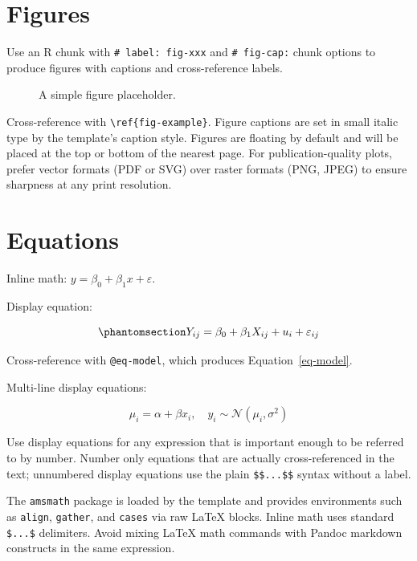 \documentclass[
    a4paper,
    man,
    floatsintext
]{glossaPX2}
\begin{document}
\section{Figures}\label{figures}

Use an R chunk with \texttt{\#\textbar{}\ label:\ fig-xxx} and
\texttt{\#\textbar{}\ fig-cap:} chunk options to produce figures with
captions and cross-reference labels.

\begin{figure}[ht]
  \centering
  \fbox{\rule{0pt}{3cm}\rule{0.8\linewidth}{0pt}}
  \caption{A simple figure placeholder.}
  \label{fig-example}
\end{figure}

Cross-reference with \texttt{\textbackslash{}ref\{fig-example\}}. Figure
captions are set in small italic type by the template's caption style.
Figures are floating by default and will be placed at the top or bottom
of the nearest page. For publication-quality plots, prefer vector
formats (PDF or SVG) over raster formats (PNG, JPEG) to ensure sharpness
at any print resolution.

\section{Equations}\label{equations}

Inline math: \(y = \beta_0 + \beta_1 x + \varepsilon\).

Display equation:

\begin{equation}\phantomsection\label{eq-model}{
Y_{ij} = \beta_0 + \beta_1 X_{ij} + u_i + \varepsilon_{ij}
}\end{equation}

Cross-reference with \texttt{@eq-model}, which produces
Equation~\ref{eq-model}.

Multi-line display equations:

\[
\mu_i = \alpha + \beta x_i, \quad y_i \sim \mathcal{N}(\mu_i, \sigma^2)
\]

Use display equations for any expression that is important enough to be
referred to by number. Number only equations that are actually
cross-referenced in the text; unnumbered display equations use the plain
\texttt{\$\$...\$\$} syntax without a label.

The \texttt{amsmath} package is loaded by the template and provides
environments such as \texttt{align}, \texttt{gather}, and \texttt{cases}
via raw LaTeX blocks. Inline math uses standard \texttt{\$...\$}
delimiters. Avoid mixing LaTeX math commands with Pandoc markdown
constructs in the same expression.
\end{document}
